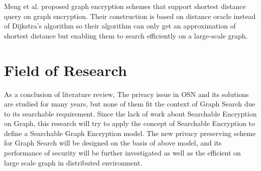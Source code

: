 Meng et al. \cite{meng2015grecs} proposed graph encryption schemes that support shortest distance query on graph encryption. Their construction is based on distance oracle instead of Dijkstra's algorithm so their algorithm can only get an approximation of shortest distance but enabling them to search efficiently on a large-scale graph.

\section{Field of Research}
As a conclusion of literature review, The privacy issue in OSN and its solutions are studied for many years, but none of them fit the context of Graph Search due to its searchable requirement. Since the lack of work about Searchable Encryption on Graph, this research will try to apply the concept of Searchable Encryption to define a Searchable Graph Encryption model. The new privacy preserving scheme for Graph Search will be designed on the basis of above model, and its performance of security will be further investigated as well as the efficient on large scale graph in distributed environment.
















